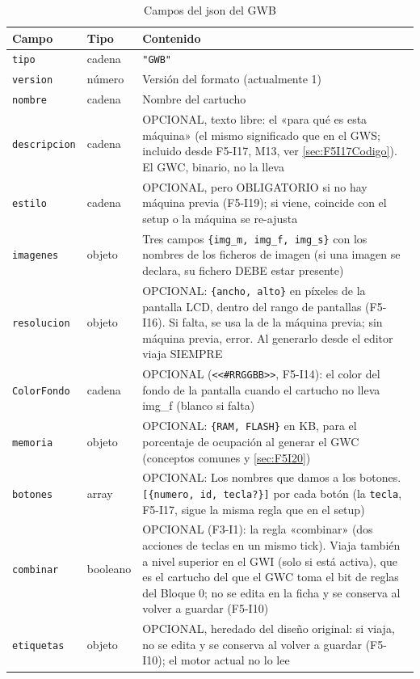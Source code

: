 \begin{table}[H]
	\centering
	\begin{tabular}{llp{10cm}}
		\toprule
		Campo & Tipo & Contenido \\
		\midrule
		\texttt{tipo} & cadena & \texttt{"GWB"} \\
		\texttt{version} & número & Versión del formato (actualmente 1) \\
		\texttt{nombre} & cadena & Nombre del cartucho \\

		\texttt{descripcion} & cadena & OPCIONAL, texto libre: el «para qué es esta máquina» (el mismo significado que en el GWS; incluido desde F5-I17, M13, ver \ref{sec:F5I17Codigo}). El GWC, binario, no la lleva \\
		\texttt{estilo} & cadena & OPCIONAL, pero OBLIGATORIO si no hay máquina previa (F5-I19); si viene, coincide con el setup o la máquina se re-ajusta \\
		\texttt{imagenes} & objeto & Tres campos \texttt{\{img\_m, img\_f, img\_s\}} con los  nombres de los ficheros de imagen (si una imagen se declara, su fichero DEBE estar presente) \\
		\texttt{resolucion} & objeto & OPCIONAL: \texttt{\{ancho, alto\}} en píxeles de la pantalla LCD, dentro del rango de pantallas (F5-I16). Si falta, se usa la de la máquina previa; sin máquina previa, error. Al generarlo desde el editor viaja SIEMPRE \\
		\texttt{ColorFondo} & cadena & OPCIONAL (\texttt{<<\#RRGGBB>>}, F5-I14): el color del fondo de la pantalla cuando el cartucho no lleva img\_f (blanco si falta) \\
		\texttt{memoria} & objeto & OPCIONAL: \texttt{\{RAM, FLASH\}} en KB, para el porcentaje de ocupación al generar el GWC (conceptos comunes y \ref{sec:F5I20}) \\
		\texttt{botones} & array & OPCIONAL: Los nombres que damos a los botones. \texttt{[\{numero, id, tecla?\}]} por cada botón (la \texttt{tecla}, F5-I17, sigue la misma regla que en el setup) \\
		\texttt{combinar} & booleano & OPCIONAL (F3-I1): la regla «combinar» (dos acciones de teclas en un mismo tick). Viaja también a nivel superior en el GWI (solo si está activa), que es el cartucho del que el GWC toma el bit de reglas del Bloque 0; no se edita en la ficha y se conserva al volver a guardar (F5-I10) \\
		\texttt{etiquetas} & objeto & OPCIONAL, heredado del diseño original: si viaja, no se edita y se conserva al volver a guardar (F5-I10); el motor actual no lo lee \\
		\bottomrule
	\end{tabular}
	\caption{Campos del json del GWB}
	\label{tab:A02GWB}
\end{table}

